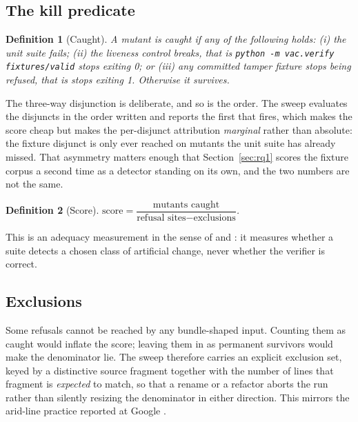 \documentclass[11pt]{article}
\newtheorem{definition}{Definition}
\begin{document}
\subsection{The kill predicate}

\begin{definition}[Caught]
A mutant is \emph{caught} if any of the following holds: (i) the unit suite fails; (ii) the
liveness control breaks, that is \texttt{python -m vac.verify fixtures/valid} stops exiting
0; or (iii) any committed tamper fixture stops being refused, that is stops exiting 1.
Otherwise it \emph{survives}.
\end{definition}

The three-way disjunction is deliberate, and so is the order. The sweep evaluates the
disjuncts in the order written and reports the first that fires, which makes the score cheap
but makes the per-disjunct attribution \emph{marginal} rather than absolute: the fixture
disjunct is only ever reached on mutants the unit suite has already missed. That asymmetry
matters enough that Section~\ref{sec:rq1} scores the fixture corpus a second time as a
detector standing on its own, and the two numbers are not the same.

\begin{definition}[Score]
$\mathrm{score} = \dfrac{\text{mutants caught}}{\text{refusal sites} - \text{exclusions}}$.
\end{definition}

This is an adequacy measurement in the sense of \citet{budd1980theoretical} and
\citet{zhu1997adequacy}: it measures whether a suite detects a chosen class of artificial
change, never whether the verifier is correct.

\subsection{Exclusions}
\label{sec:exclusions}

Some refusals cannot be reached by any bundle-shaped input. Counting them as caught would
inflate the score; leaving them in as permanent survivors would make the denominator lie.
The sweep therefore carries an explicit exclusion set, keyed by a distinctive source fragment
together with the number of lines that fragment is \emph{expected} to match, so that a
rename or a refactor aborts the run rather than silently resizing the denominator in either
direction. This mirrors the arid-line practice reported at Google
\citep{petrovic2018google}.
\end{document}
